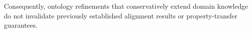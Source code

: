 Consequently, ontology refinements that conservatively extend domain knowledge do not invalidate previously established alignment results or property-transfer guarantees. 

%
%
